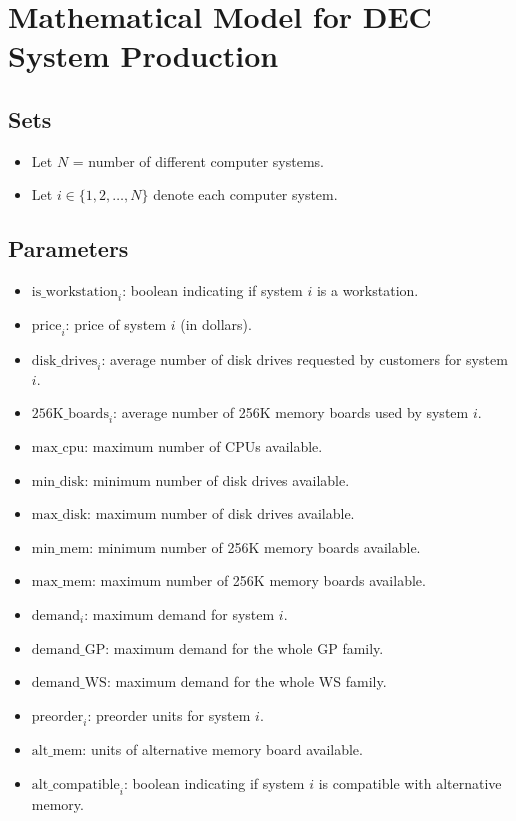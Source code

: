 \documentclass{article}
\begin{document}
\section*{Mathematical Model for DEC System Production}

\subsection*{Sets}
\begin{itemize}
    \item Let \( N \) = number of different computer systems.
    \item Let \( i \in \{1, 2, \ldots, N\} \) denote each computer system.
\end{itemize}

\subsection*{Parameters}
\begin{itemize}
    \item \( \text{is\_workstation}_i \): boolean indicating if system \( i \) is a workstation.
    \item \( \text{price}_i \): price of system \( i \) (in dollars).
    \item \( \text{disk\_drives}_i \): average number of disk drives requested by customers for system \( i \).
    \item \( \text{256K\_boards}_i \): average number of 256K memory boards used by system \( i \).
    \item \( \text{max\_cpu} \): maximum number of CPUs available.
    \item \( \text{min\_disk} \): minimum number of disk drives available.
    \item \( \text{max\_disk} \): maximum number of disk drives available.
    \item \( \text{min\_mem} \): minimum number of 256K memory boards available.
    \item \( \text{max\_mem} \): maximum number of 256K memory boards available.
    \item \( \text{demand}_i \): maximum demand for system \( i \).
    \item \( \text{demand\_GP} \): maximum demand for the whole GP family.
    \item \( \text{demand\_WS} \): maximum demand for the whole WS family.
    \item \( \text{preorder}_i \): preorder units for system \( i \).
    \item \( \text{alt\_mem} \): units of alternative memory board available.
    \item \( \text{alt\_compatible}_i \): boolean indicating if system \( i \) is compatible with alternative memory.
\end{itemize}
\end{document}
